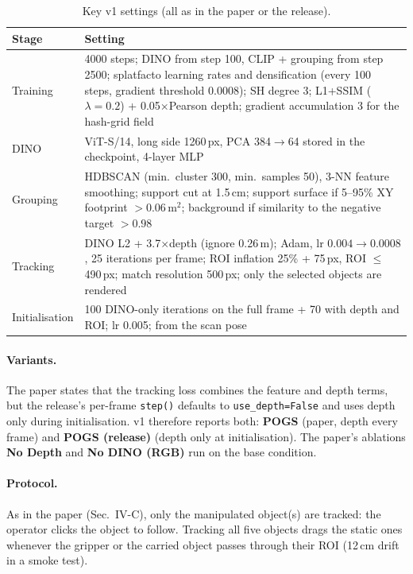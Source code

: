 \documentclass[10pt,a4paper]{article}
\begin{document}
\begin{table}[t]
\centering\small
\caption{Key v1 settings (all as in the paper or the release).}
\label{tab:hparams}
\begin{tabularx}{\linewidth}{l X}
\toprule
Stage & Setting \\
\midrule
Training & 4000 steps; DINO from step 100, CLIP + grouping from step 2500; splatfacto learning rates and densification (every 100 steps, gradient threshold 0.0008); SH degree 3; L1+SSIM ($\lambda = 0.2$) + 0.05$\times$Pearson depth; gradient accumulation 3 for the hash-grid field \\
DINO & ViT-S/14, long side 1260\,px, PCA 384$\to$64 stored in the checkpoint, 4-layer MLP \\
Grouping & HDBSCAN (min.\ cluster 300, min.\ samples 50), 3-NN feature smoothing; support cut at 1.5\,cm; support surface if 5--95\% XY footprint $>0.06$\,m$^2$; background if similarity to the negative target $>0.98$ \\
Tracking & DINO L2 + 3.7$\times$depth (ignore 0.26\,m); Adam, lr $0.004\to0.0008$, 25 iterations per frame; ROI inflation 25\% + 75\,px, ROI $\le$ 490\,px; match resolution 500\,px; only the selected objects are rendered \\
Initialisation & 100 DINO-only iterations on the full frame + 70 with depth and ROI; lr 0.005; from the scan pose \\
\bottomrule
\end{tabularx}
\end{table}

\paragraph{Variants.} The paper states that the tracking loss combines the
feature and depth terms, but the release's per-frame \texttt{step()} defaults to
\texttt{use\_depth=False} and uses depth only during initialisation. v1 therefore
reports both: \textbf{POGS} (paper, depth every frame) and \textbf{POGS (release)}
(depth only at initialisation). The paper's ablations \textbf{No Depth} and
\textbf{No DINO (RGB)} run on the base condition.

\paragraph{Protocol.} As in the paper (Sec.~IV-C), only the manipulated
object(s) are tracked: the operator clicks the object to follow. Tracking all
five objects drags the static ones whenever the gripper or the carried object
passes through their ROI (12\,cm drift in a smoke test).
\end{document}
